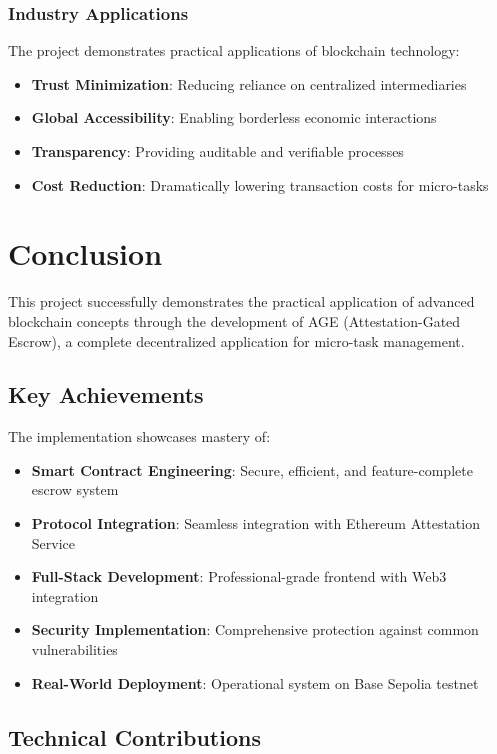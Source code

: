 \documentclass[12pt,a4paper]{article}
\begin{document}
\subsubsection{Industry Applications}
The project demonstrates practical applications of blockchain technology:
\begin{itemize}
    \item \textbf{Trust Minimization}: Reducing reliance on centralized intermediaries
    \item \textbf{Global Accessibility}: Enabling borderless economic interactions
    \item \textbf{Transparency}: Providing auditable and verifiable processes
    \item \textbf{Cost Reduction}: Dramatically lowering transaction costs for micro-tasks
\end{itemize}

\section{Conclusion}

This project successfully demonstrates the practical application of advanced blockchain concepts through the development of AGE (Attestation-Gated Escrow), a complete decentralized application for micro-task management.

\subsection{Key Achievements}

The implementation showcases mastery of:
\begin{itemize}
    \item \textbf{Smart Contract Engineering}: Secure, efficient, and feature-complete escrow system
    \item \textbf{Protocol Integration}: Seamless integration with Ethereum Attestation Service
    \item \textbf{Full-Stack Development}: Professional-grade frontend with Web3 integration
    \item \textbf{Security Implementation}: Comprehensive protection against common vulnerabilities
    \item \textbf{Real-World Deployment}: Operational system on Base Sepolia testnet
\end{itemize}

\subsection{Technical Contributions}
\end{document}
